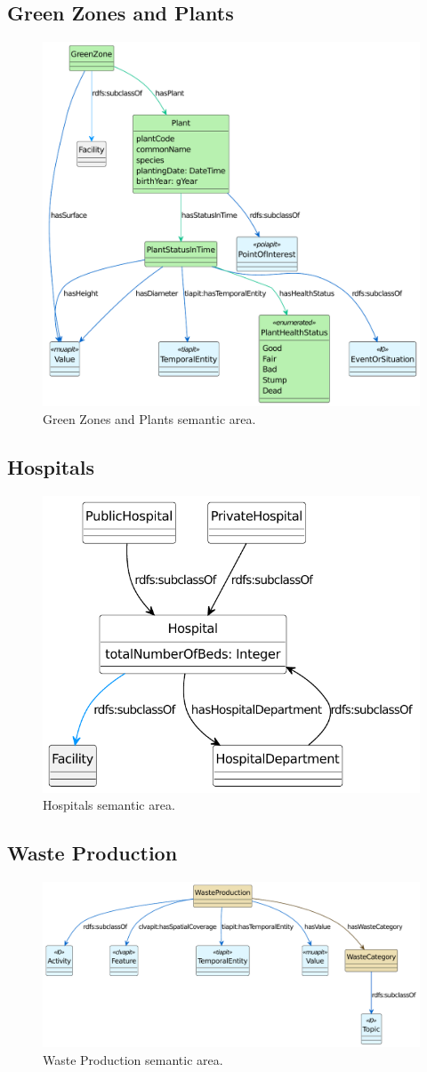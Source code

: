 \subsection{Green Zones and Plants}
\label{subsec:green-zones}

\begin{figure}[!ht]
  \centering
  \includegraphics[width=0.6\columnwidth]{images/ontoim/green}
  \caption{Green Zones and Plants semantic area.}
  \label{fig:green-sa}
\end{figure}

\subsection{Hospitals}
\label{subsec:hospitals}

\begin{figure}[!ht]
  \centering
  \includegraphics[width=0.5\columnwidth]{images/ontoim/hospitals}
  \caption{Hospitals semantic area.}
  \label{fig:hospitals-sa}
\end{figure}

\subsection{Waste Production}
\label{subsec:waste-production}

\begin{figure}[!ht]
  \centering
  \includegraphics[width=\columnwidth]{images/ontoim/waste}
  \caption{Waste Production semantic area.}
  \label{fig:waste-sa}
\end{figure}